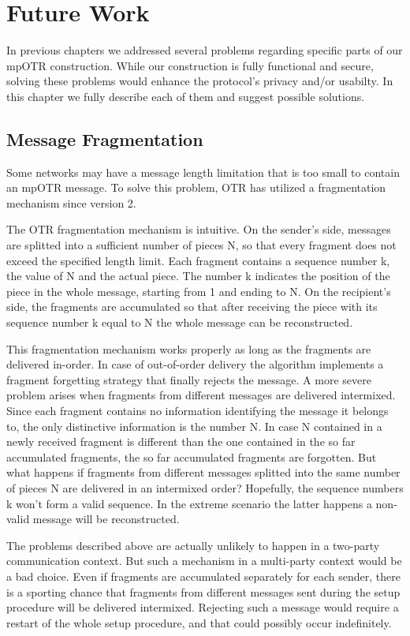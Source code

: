 \chapter{Future Work}
\label{chapter:future_work}
In previous chapters we addressed several problems regarding specific parts of our mpOTR construction. While our construction is fully functional and secure, solving these problems would enhance the protocol's privacy and/or usabilty. In this chapter we fully describe each of them and suggest possible solutions.

\section{Message Fragmentation}
\label{sections:fragmentation}
Some networks may have a message length limitation that is too small to contain an mpOTR message. To solve this problem, OTR has utilized a fragmentation mechanism since version 2.

The OTR fragmentation mechanism is intuitive. On the sender's side, messages are splitted into a sufficient number of pieces N, so that every fragment does not exceed the specified length limit. Each fragment contains a sequence number k, the value of N and the actual piece. The number k indicates the position of the piece in the whole message, starting from 1 and ending to N. On the recipient's side, the fragments are accumulated so that after receiving the piece with its sequence number k equal to N the whole message can be reconstructed.

This fragmentation mechanism works properly as long as the fragments are delivered in-order. In case of out-of-order delivery the algorithm implements a fragment forgetting strategy that finally rejects the message. A more severe problem arises when fragments from different messages are delivered intermixed. Since each fragment contains no information identifying the message it belongs to, the only distinctive information is the number N. In case N contained in a newly received fragment is different than the one contained in the so far accumulated fragments, the so far accumulated fragments are forgotten. But what happens if fragments from different messages splitted into the same number of pieces N are delivered in an intermixed order? Hopefully, the sequence numbers k won't form a valid sequence. In the extreme scenario the latter happens a non-valid message will be reconstructed.

The problems described above are actually unlikely to happen in a two-party communication context. But such a mechanism in a multi-party context would be a bad choice. Even if fragments are accumulated separately for each sender, there is a sporting chance that fragments from different messages sent during the setup procedure will be delivered intermixed. Rejecting such a message would require a restart of the whole setup procedure, and that could possibly occur indefinitely.

